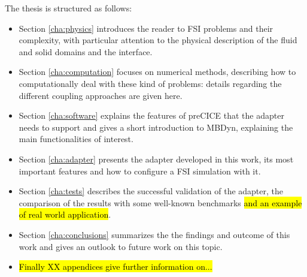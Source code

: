 The thesis is structured as follows:
\begin{itemize}
	\item Section \ref{cha:physics} introduces the reader to FSI problems and their complexity, with particular attention to the physical description of the fluid and solid domains and the interface. 
	\item Section \ref{cha:computation} focuses on numerical methods, describing how to computationally deal with these kind of problems: details regarding the different coupling approaches are given here.
	\item Section \ref{cha:software} explains the features of preCICE that the adapter needs to support and gives a short introduction to MBDyn, explaining the main functionalities of interest.
	\item Section \ref{cha:adapter} presents the adapter developed in this work, its most important features and how to configure a FSI simulation with it.
	\item Section \ref{cha:tests} describes the successful validation of the adapter, the comparison of the results with some well-known benchmarks \hl{and an example of real world application}.
	\item Section \ref{cha:conclusions} summarizes the the findings and outcome of this work and gives an outlook to future work on this topic.
	\item \hl{Finally XX appendices give further information on...}   
\end{itemize} 
